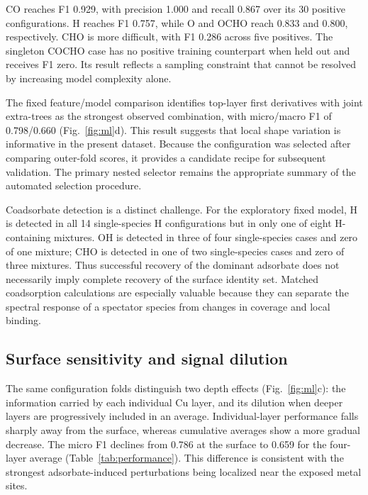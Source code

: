 \documentclass[11pt,a4paper]{article}
\begin{document}
CO reaches F1 0.929, with precision 1.000 and recall 0.867 over its 30 positive configurations. H reaches F1 0.757, while O and OCHO reach 0.833 and 0.800, respectively. CHO is more difficult, with F1 0.286 across five positives. The singleton COCHO case has no positive training counterpart when held out and receives F1 zero. Its result reflects a sampling constraint that cannot be resolved by increasing model complexity alone.

The fixed feature/model comparison identifies top-layer first derivatives with joint extra-trees as the strongest observed combination, with micro/macro F1 of 0.798/0.660 (Fig.~\ref{fig:ml}d). This result suggests that local shape variation is informative in the present dataset. Because the configuration was selected after comparing outer-fold scores, it provides a candidate recipe for subsequent validation. The primary nested selector remains the appropriate summary of the automated selection procedure.

Coadsorbate detection is a distinct challenge. For the exploratory fixed model, H is detected in all 14 single-species H configurations but in only one of eight H-containing mixtures. OH is detected in three of four single-species cases and zero of one mixture; CHO is detected in one of two single-species cases and zero of three mixtures. Thus successful recovery of the dominant adsorbate does not necessarily imply complete recovery of the surface identity set. Matched coadsorption calculations are especially valuable because they can separate the spectral response of a spectator species from changes in coverage and local binding.

\subsection{Surface sensitivity and signal dilution}
The same configuration folds distinguish two depth effects (Fig.~\ref{fig:ml}c): the information carried by each individual Cu layer, and its dilution when deeper layers are progressively included in an average. Individual-layer performance falls sharply away from the surface, whereas cumulative averages show a more gradual decrease. The micro F1 declines from 0.786 at the surface to 0.659 for the four-layer average (Table~\ref{tab:performance}). This difference is consistent with the strongest adsorbate-induced perturbations being localized near the exposed metal sites.
\end{document}
